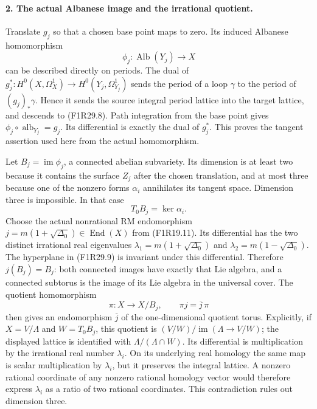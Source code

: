 \paragraph{2. The actual Albanese image and the irrational quotient.}
Translate $g_j$ so that a chosen base point maps
to zero. Its induced Albanese homomorphism
\[
              \phi_j:\operatorname{Alb}(Y_j)
                                     \longrightarrow X
 \tag{F1R29.8}
\]
can be described directly on periods.
The dual of
$g_j^*:H^0(X,\Omega_X^1)\to H^0(Y_j,\Omega_{Y_j}^1)$
sends the period of a loop $\gamma$ to the
period of $(g_j)_*\gamma$. Hence it sends
the source integral period lattice into the
target lattice, and descends to (F1R29.8).
Path integration from the base point gives
$\phi_j\circ\operatorname{alb}_{Y_j}=g_j$.
Its differential is exactly the dual of $g_j^*$.
This proves the tangent assertion used here
from the actual homomorphism.

Let $B_j=\operatorname{im}\phi_j$, a connected
abelian subvariety. Its dimension is at least
two because it contains the surface $Z_j$
after the chosen translation, and at most
three because one of the nonzero forms
$\alpha_i$ annihilates its tangent space.
Dimension three is impossible. In that case
\[
                         T_0B_j=\ker\alpha_i.
 \tag{F1R29.9}
\]
Choose the actual nonrational RM endomorphism
$j=m(1+\sqrt{\Delta_0})\in\operatorname{End}(X)$
from (F1R19.11). Its differential has the
two distinct irrational real eigenvalues
$\lambda_1=m(1+\sqrt{\Delta_0})$ and
$\lambda_2=m(1-\sqrt{\Delta_0})$.
The hyperplane in (F1R29.9) is invariant under
this differential. Therefore $j(B_j)=B_j$:
both connected images have exactly that Lie
algebra, and a connected subtorus is the image
of its Lie algebra in the universal cover.
The quotient homomorphism
\[
       \pi:X\longrightarrow X/B_j,
       \qquad \pi j=\overline j\,\pi
 \tag{F1R29.10}
\]
then gives an endomorphism $\overline j$ of the
one-dimensional quotient torus. Explicitly,
if $X=V/\Lambda$ and $W=T_0B_j$, this quotient
is $(V/W)/\operatorname{im}(\Lambda\to V/W)$;
the displayed lattice is identified with
$\Lambda/(\Lambda\cap W)$.
Its differential is multiplication
by the irrational real number $\lambda_i$.
On its underlying real homology the same
map is scalar multiplication by $\lambda_i$,
but it preserves the integral lattice.
A nonzero rational coordinate of any nonzero
rational homology vector would therefore
express $\lambda_i$ as a ratio of two rational
coordinates. This contradiction rules out
dimension three.

